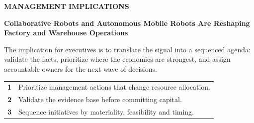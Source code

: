 \documentclass[10pt,a4paper]{article}
\begin{document}
\clearpage
{\textcolor{BOBlue}{\scriptsize\bfseries MANAGEMENT IMPLICATIONS}}\par\vspace{-1pt}
{\Large\sffamily\bfseries\color{BONavy} Collaborative Robots and Autonomous Mobile Robots Are Reshaping Factory and Warehouse Operations}\par\vspace{4pt}
{\small The implication for executives is to translate the signal into a sequenced agenda: validate the facts, prioritize where the economics are strongest, and assign accountable owners for the next wave of decisions.}\par
\begin{tabularx}{\linewidth}{p{10mm}Y}
\textcolor{BOBlue}{\bfseries 1} & Prioritize management actions that change resource allocation. \\[5pt]
\textcolor{BOBlue}{\bfseries 2} & Validate the evidence base before committing capital. \\[5pt]
\textcolor{BOBlue}{\bfseries 3} & Sequence initiatives by materiality, feasibility and timing. \\[5pt]
\end{tabularx}
\vspace{6pt}

\vspace{6pt}{\textcolor{BOBlue}{\scriptsize\bfseries EXECUTION ROADMAP}}\par
\begin{center}
\end{center}
\end{document}
